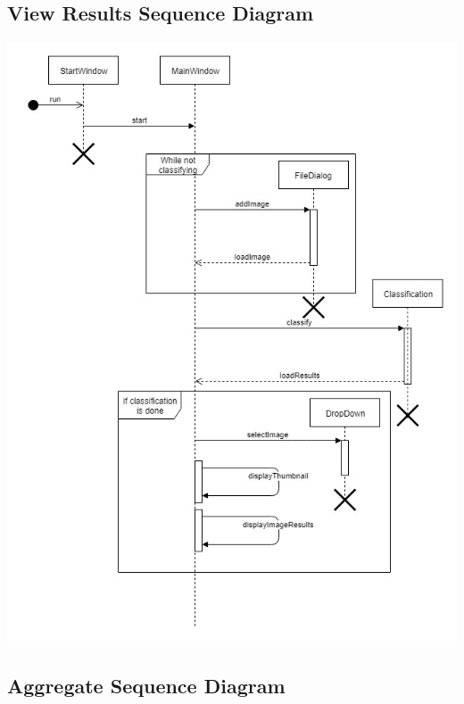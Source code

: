 \documentclass[parskip=full]{scrartcl}
\begin{document}
\begin{itemize}
\pagebreak

\subsection {View Results Sequence Diagram}

\begin{center}
\includegraphics[width=1.0\textwidth]{ViewResults.jpg}
\end{center}

\pagebreak

\subsection {Aggregate Sequence Diagram}


\end{itemize}
\end{document}
